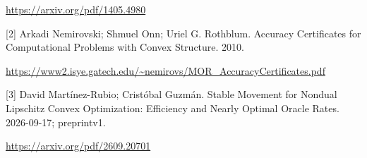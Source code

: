 \documentclass[10pt,a4paper]{article}
\begin{document}
\url{https://arxiv.org/pdf/1405.4980}

[2] Arkadi Nemirovski; Shmuel Onn; Uriel G. Rothblum. Accuracy Certificates for Computational Problems with Convex Structure. 2010.

\url{https://www2.isye.gatech.edu/~nemirovs/MOR_AccuracyCertificates.pdf}

[3] David Martínez-Rubio; Cristóbal Guzmán. Stable Movement for Nondual Lipschitz Convex Optimization: Efficiency and Nearly Optimal Oracle Rates. 2026-09-17; preprintv1.

\url{https://arxiv.org/pdf/2609.20701}
\end{document}
